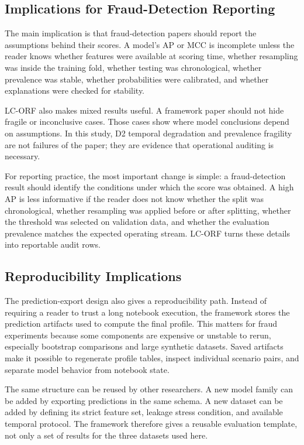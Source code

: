 \documentclass{ieeeaccess}
\begin{document}
\subsection{Implications for Fraud-Detection Reporting}
The main implication is that fraud-detection papers should report the assumptions behind their scores. A model's AP or MCC is incomplete unless the reader knows whether features were available at scoring time, whether resampling was inside the training fold, whether testing was chronological, whether prevalence was stable, whether probabilities were calibrated, and whether explanations were checked for stability.

LC-ORF also makes mixed results useful. A framework paper should not hide fragile or inconclusive cases. Those cases show where model conclusions depend on assumptions. In this study, D2 temporal degradation and prevalence fragility are not failures of the paper; they are evidence that operational auditing is necessary.

For reporting practice, the most important change is simple: a fraud-detection result should identify the conditions under which the score was obtained. A high AP is less informative if the reader does not know whether the split was chronological, whether resampling was applied before or after splitting, whether the threshold was selected on validation data, and whether the evaluation prevalence matches the expected operating stream. LC-ORF turns these details into reportable audit rows.

\subsection{Reproducibility Implications}
The prediction-export design also gives a reproducibility path. Instead of requiring a reader to trust a long notebook execution, the framework stores the prediction artifacts used to compute the final profile. This matters for fraud experiments because some components are expensive or unstable to rerun, especially bootstrap comparisons and large synthetic datasets. Saved artifacts make it possible to regenerate profile tables, inspect individual scenario pairs, and separate model behavior from notebook state.

The same structure can be reused by other researchers. A new model family can be added by exporting predictions in the same schema. A new dataset can be added by defining its strict feature set, leakage stress condition, and available temporal protocol. The framework therefore gives a reusable evaluation template, not only a set of results for the three datasets used here.
\end{document}
